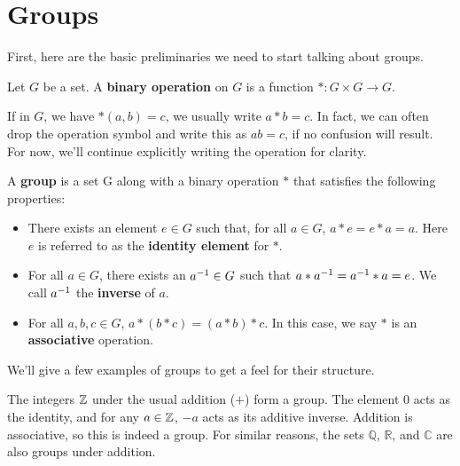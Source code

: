 \section{Groups}

First, here are the basic preliminaries we need to start talking about groups.

\begin{definition}
\label{binaryoperation}
Let $G$ be a set. A \textbf{binary operation} on $G$ is a function $*: G \times G \to G$.
\end{definition}

If in $G$, we have $*(a, b) = c$, we usually write $a * b = c$. In fact, we can often drop the operation symbol and write this as $ab = c$, if no confusion will result. For now, we'll continue explicitly writing the operation for clarity.


\begin{definition}
A \textbf{group} is a set G along with a binary operation $*$ that satisfies the following properties:
\begin{itemize}
    \item There exists an element $e \in G$ such that, for all $a \in G$, $a*e = e*a = a$. Here $e$ is referred to as the \textbf{identity element} for $*$.
    \item For all $a \in G$, there exists an $a^{-1} \in G$ such that $a*a^{-1} = a^{-1}*a = e$. We call $a^{-1}$ the \textbf{inverse} of $a$.
    \item For all $a, b, c \in G$, $a * (b * c) = (a * b) * c$. In this case, we say $*$ is an \textbf{associative} operation.
\end{itemize}
\end{definition}

We'll give a few examples of groups to get a feel for their structure.

\begin{example}
The integers $\mathbb{Z}$ under the usual addition ($+$) form a group. The element $0$ acts as the identity, and for any $a \in \mathbb{Z}$, $-a$ acts as its additive inverse. Addition is associative, so this is indeed a group. For similar reasons, the sets $\mathbb{Q}$, $\mathbb{R}$, and $\mathbb{C}$ are also groups under addition.
\end{example}

